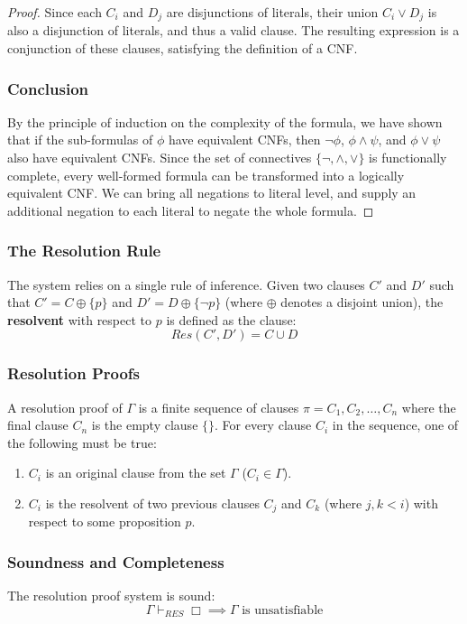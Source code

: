 \documentclass{article}
\newtheorem{theorem}{Theorem}[section]
\let\oldtheorem\theorem
\let\endoldtheorem\endtheorem
\renewenvironment{theorem}
  {\begin{tcolorbox}[
      colback=yellow!6,
      colframe=yellow!60!black,
      boxrule=0.6pt,
      arc=2pt,
      left=6pt,right=6pt,top=4pt,bottom=4pt,
      parbox=false
    ]\oldtheorem}
  {\endoldtheorem\end{tcolorbox}}
\begin{document}
\begin{proof}
Since each $C_i$ and $D_j$ are disjunctions of literals, their union $C_i \lor D_j$ is also a disjunction of literals, and thus a valid clause. The resulting expression is a conjunction of these clauses, satisfying the definition of a CNF.

\subsubsection*{Conclusion}
By the principle of induction on the complexity of the formula, we have shown that if the sub-formulas of $\phi$ have equivalent CNFs, then $\neg \phi$, $\phi \land \psi$, and $\phi \lor \psi$ also have equivalent CNFs. Since the set of connectives $\{\neg, \land, \lor\}$ is functionally complete, every well-formed formula can be transformed into a logically equivalent CNF.
We can bring all negations to literal level, and supply an additional negation to each literal to negate the whole formula.
\end{proof}

\subsubsection*{The Resolution Rule}
The system relies on a single rule of inference. Given two clauses $C'$ and $D'$ such that $C' = C \oplus \{p\}$ and $D' = D \oplus \{\neg p\}$ (where $\oplus$ denotes a disjoint union), the \textbf{resolvent} with respect to $p$ is defined as the clause:
\[ Res(C', D') = C \cup D \]

\subsubsection*{Resolution Proofs}
A resolution proof of $\Gamma$ is a finite sequence of clauses $\pi = C_1, C_2, \dots, C_n$ where the final clause $C_n$ is the empty clause $\{\}$. For every clause $C_i$ in the sequence, one of the following must be true:
\begin{enumerate}
    \item $C_i$ is an original clause from the set $\Gamma$ ($C_i \in \Gamma$).
    \item $C_i$ is the resolvent of two previous clauses $C_j$ and $C_k$ (where $j, k < i$) with respect to some proposition $p$.
\end{enumerate}

\subsubsection*{Soundness and Completeness}
\begin{theorem}[Soundness]
    The resolution proof system is sound: 
    \[ \Gamma \vdash_{RES} \Box \implies \Gamma \text{ is unsatisfiable} \]
\end{theorem}
\end{document}
